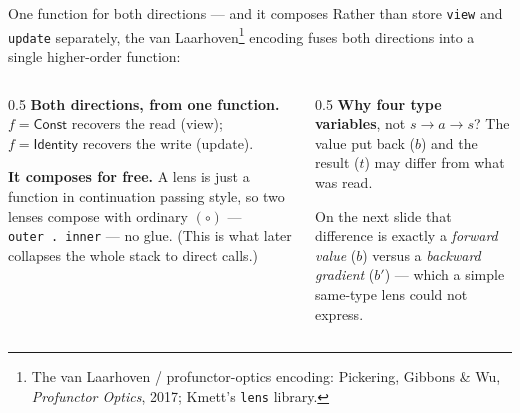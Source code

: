 \documentclass[aspectratio=169,11pt]{beamer}
\begin{document}
\begin{frame}{One function for both directions --- and it composes}
  \small Rather than store \texttt{view} and \texttt{update} separately, the van Laarhoven\footnote[frame]{The van Laarhoven / profunctor-optics encoding: Pickering, Gibbons \& Wu, \emph{Profunctor Optics}, 2017; Kmett's \texttt{lens} library.} encoding fuses both directions into a single higher-order function:
  \begin{center}\end{center}
  \vspace{0.4em}
  \begin{columns}[T]
    \begin{column}{0.5\textwidth}
      \footnotesize
      \textbf{Both directions, from one function.} $f=\textsf{Const}$ recovers the read (view);
      $f=\textsf{Identity}$ recovers the write (update).
      \vspace{0.5em}

      \textbf{It composes for free.} A lens is just a function in continuation passing style, so two lenses compose with ordinary
      $(\circ)$ --- \texttt{outer\,.\,inner} --- no glue. (This is what later collapses the whole stack
      to direct calls.)
    \end{column}
    \begin{column}{0.5\textwidth}
      \footnotesize
      \textbf{Why four type variables}, not $s\!\to\!a\!\to\!s$? The value put back ($b$) and the
      result ($t$) may differ from what was read.
      \vspace{0.5em}

      On the next slide that difference is exactly a \emph{forward value} ($b$) versus a
      \emph{backward gradient} ($b'$) --- which a simple same-type lens could not express.
    \end{column}
  \end{columns}
\end{frame}
\end{document}
